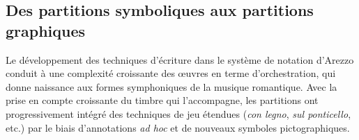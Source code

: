 \subsection{Des partitions symboliques aux partitions graphiques}

\noindent Le développement des techniques d'écriture dans le système de notation d'Arezzo conduit à une complexité croissante des œuvres en terme d'orchestration, qui donne naissance aux formes symphoniques de la musique romantique. Avec la prise en compte croissante du timbre qui l'accompagne, les partitions ont progressivement intégré des techniques de jeu étendues (\textit{con legno}, \textit{sul ponticello}, etc.) par le biais d'annotations \textit{ad hoc} et de nouveaux symboles pictographiques. %

